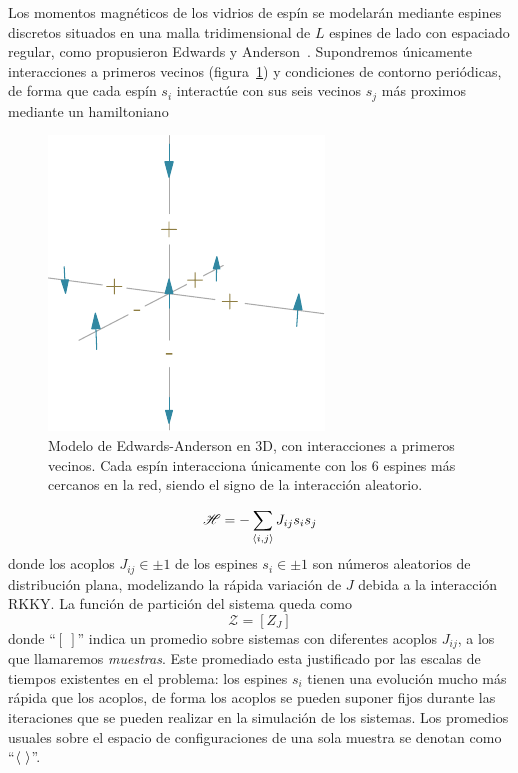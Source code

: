 \documentclass[11pt]{report}
\newcommand{\Ham}{\mathscr{H}}
\begin{document}
Los momentos magnéticos de los vidrios de espín se modelarán mediante
espines discretos situados en una malla tridimensional de $L$ espines
de lado con espaciado regular, como propusieron Edwards y
Anderson~\cite{mranderson}. Supondremos únicamente interacciones a
primeros vecinos (figura~\ref{fig:EA}) y condiciones de contorno
periódicas, de forma que cada espín $s_i$ interactúe con sus seis
vecinos $s_j$ más proximos mediante un hamiltoniano
\begin{figure}
  \centering
  \includegraphics{../study_cases/EAfigure/EAfigure.pdf}
  \caption{Modelo de Edwards-Anderson en 3D, con interacciones a
    primeros vecinos. Cada espín interacciona únicamente con los 6
    espines más cercanos en la red, siendo el signo de la interacción
    aleatorio.}
  \label{fig:EA}
\end{figure}
\begin{equation}
  \Ham = - \sum_{\expval{i,j}}  J_{ij} s_i s_j
\end{equation}
donde los acoplos $J_{ij}∈\pm1$ de los espines $s_i∈\pm1$ son
números aleatorios de distribución plana, modelizando la rápida
variación de $J$ debida a la interacción RKKY. La función de
partición del sistema queda como
\begin{equation}
  \mathcal{Z} = [Z_J]
\end{equation}
donde ``$[\ ]$'' indica un promedio sobre sistemas con diferentes
acoplos $J_{ij}$, a los que llamaremos \textit{muestras}. Este
promediado esta justificado por las escalas de tiempos existentes en
el problema: los espines $s_i$ tienen una evolución mucho más rápida
que los acoplos, de forma los acoplos se pueden suponer fijos durante
las iteraciones que se pueden realizar en la simulación de los
sistemas. Los promedios usuales sobre el espacio de configuraciones de
una sola muestra se denotan como ``$\expval{\ }$''.
\end{document}
